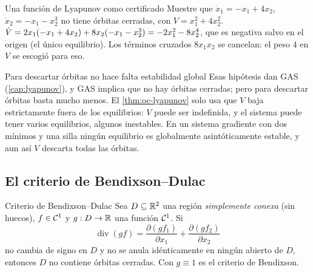 \begin{ejemplo}[label=ej:oc-lyapunov]{Una función de Lyapunov como certificado}
Muestre que $\dot x_1=-x_1+4x_2$, $\dot x_2=-x_1-x_2^3$ no tiene órbitas cerradas, con $V=x_1^2+4x_2^2$.
\solucion $\dot V=2x_1(-x_1+4x_2)+8x_2(-x_1-x_2^3)=-2x_1^2-8x_2^4$, que es negativa salvo en el origen (el único equilibrio). Los términos cruzados $8x_1x_2$ se cancelan: el peso $4$ en $V$ se escogió para eso.
\end{ejemplo}


\begin{trampa}[label=tr:oc-gas]{Para descartar órbitas no hace falta estabilidad global}
Esas hipótesis dan GAS (\cref{cap:lyapunov}), y GAS implica que no hay órbitas cerradas; pero para descartar órbitas basta mucho menos. El \cref{thm:oc-lyapunov} solo usa que $V$ baja estrictamente fuera de los equilibrios: $V$ puede ser indefinida, y el sistema puede tener varios equilibrios, algunos inestables. En un sistema gradiente con dos mínimos y una silla ningún equilibrio es globalmente asintóticamente estable, y aun así $V$ descarta todas las órbitas.
\end{trampa}

\subsection{El criterio de Bendixson--Dulac}

\begin{teorema}[label=thm:oc-bendixson]{Criterio de Bendixson--Dulac \citep{Ben01,Dul37}}
Sea $D\subseteq\mathbb{R}^2$ una región \emph{simplemente conexa} (sin huecos), $f\in\mathcal{C}^{1}$ y $g:D\to\mathbb{R}$ una función $\mathcal{C}^{1}$. Si
\[
  \operatorname{div}(gf)=\frac{\partial(gf_1)}{\partial x_1}+\frac{\partial(gf_2)}{\partial x_2}
\]
no cambia de signo en $D$ y no se anula idénticamente en ningún abierto de $D$, entonces $D$ no contiene órbitas cerradas. Con $g\equiv1$ es el criterio de Bendixson.
\end{teorema}

